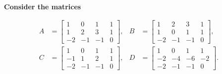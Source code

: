 
\item \textbf{Consider the matrices}

$$
\begin{aligned}
    A &=
    \begin{bmatrix}
        1 & 0 & 1 & 1 \\
        1 & 2 & 3 & 1 \\
    -2 & -1 & -1 & 0
    \end{bmatrix},
    &
    B &=
    \begin{bmatrix}
        1 & 2 & 3 & 1 \\
        1 & 0 & 1 & 1 \\
    -2 & -1 & -1 & 0
    \end{bmatrix},
    \\[1em]
    C &=
    \begin{bmatrix}
        1 & 0 & 1 & 1 \\
    -1 & 1 & 2 & 1 \\
    -2 & -1 & -1 & 0
    \end{bmatrix},
    &
    D &=
    \begin{bmatrix}
        1 & 0 & 1 & 1 \\
    -2 & -4 & -6 & -2 \\
    -2 & -1 & -1 & 0
    \end{bmatrix}.
\end{aligned}
$$

